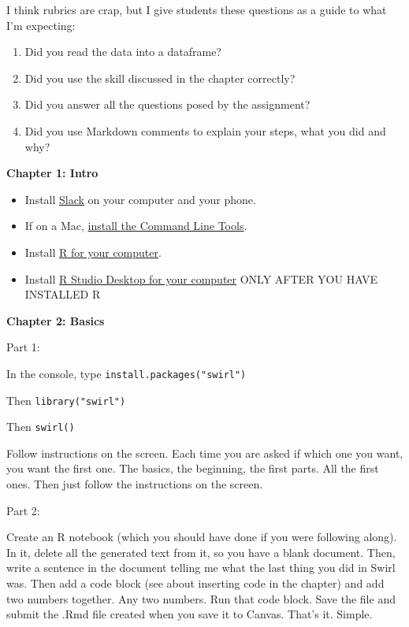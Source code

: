 \documentclass[
]{book}
\providecommand{\tightlist}{%
  \setlength{\itemsep}{0pt}\setlength{\parskip}{0pt}}
\begin{document}
I think rubrics are crap, but I give students these questions as a guide to what I'm expecting:

\begin{enumerate}
\def\labelenumi{\arabic{enumi}.}
\tightlist
\item
  Did you read the data into a dataframe?
\item
  Did you use the skill discussed in the chapter correctly?
\item
  Did you answer all the questions posed by the assignment?
\item
  Did you use Markdown comments to explain your steps, what you did and why?
\end{enumerate}

\textbf{Chapter 1: Intro}

\begin{itemize}
\tightlist
\item
  Install \href{https://slack.com/get}{Slack} on your computer and your phone.
\item
  If on a Mac, \href{http://osxdaily.com/2014/02/12/install-command-line-tools-mac-os-x/}{install the Command Line Tools}.
\item
  Install \href{https://rweb.crmda.ku.edu/cran/}{R for your computer}.
\item
  Install \href{https://www.rstudio.com/products/rstudio/download/\#download}{R Studio Desktop for your computer} ONLY AFTER YOU HAVE INSTALLED R
\end{itemize}

\textbf{Chapter 2: Basics}

Part 1:

In the console, type \texttt{install.packages("swirl")}

Then \texttt{library("swirl")}

Then \texttt{swirl()}

Follow instructions on the screen. Each time you are asked if which one you want, you want the first one. The basics, the beginning, the first parts. All the first ones. Then just follow the instructions on the screen.

Part 2:

Create an R notebook (which you should have done if you were following along). In it, delete all the generated text from it, so you have a blank document. Then, write a sentence in the document telling me what the last thing you did in Swirl was. Then add a code block (see about inserting code in the chapter) and add two numbers together. Any two numbers. Run that code block. Save the file and submit the .Rmd file created when you save it to Canvas. That's it. Simple.
\end{document}
